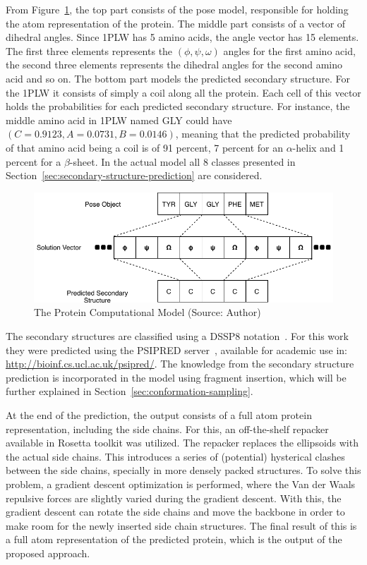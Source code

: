 From Figure~\ref{fig:protein-model}, the top part consists of the pose model, responsible for holding the atom representation of the protein. The middle part consists of a vector of dihedral angles. Since 1PLW has 5 amino acids, the angle vector has 15 elements.
The first three elements represents the $(\phi, \psi, \omega)$ angles for the
first amino acid, the second three elements represents the dihedral angles for the second
amino acid and so on. The bottom part models the predicted secondary structure. For the 1PLW it consists of simply a coil along all the protein.
Each cell of this vector holds the probabilities for each predicted secondary structure.
For instance, the middle amino acid in 1PLW named GLY could have $(C=0.9123, A=0.0731, B=0.0146)$,
meaning that the predicted probability of that amino acid being a coil is of 91 percent,
7 percent for an $\alpha$-helix and 1 percent for a $\beta$-sheet. In the actual model
all 8 classes presented in Section~\ref{sec:secondary-structure-prediction} are
considered.

\begin{figure}
    \centering
    \includegraphics{Figuras/protein-representation.pdf}
    \vspace{1mm}
    \caption{The Protein Computational Model (Source: Author)}
    \label{fig:protein-model}
\end{figure}

The secondary structures are classified using a DSSP8 notation~\cite{frishman1995knowledge}.
For this work they were predicted using the PSIPRED server~\cite{mcguffin2000psipred},
available for academic use in:
\url{http://bioinf.cs.ucl.ac.uk/psipred/}.
The knowledge from the secondary structure prediction
is incorporated in the model using fragment insertion, which will be further explained in
Section~\ref{sec:conformation-sampling}.

At the end of the prediction, the output consists of a full atom protein representation, including the side chains. For this, an off-the-shelf
repacker available in Rosetta toolkit was utilized. 
The repacker replaces the ellipsoids with the actual side chains. This introduces a series
of (potential) hysterical clashes between the side chains, specially in more densely packed
structures. To solve this problem, a gradient descent optimization is performed, where
the Van der Waals repulsive forces are slightly varied during the gradient descent.
With this, the gradient descent can rotate the side chains and move the backbone
in order to make room for the newly inserted side chain structures.
The final result of this is a full atom representation of the predicted protein, which
is the output of the proposed approach.

